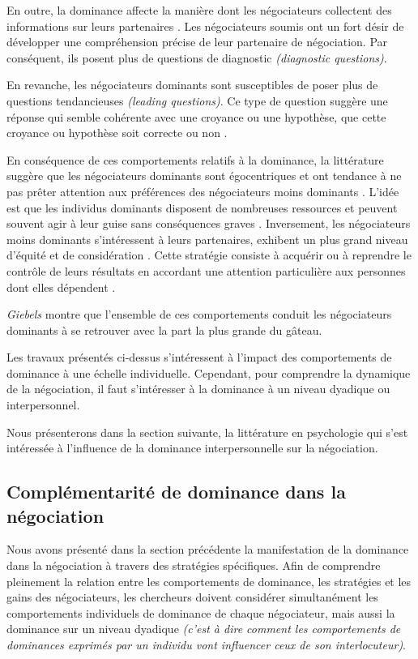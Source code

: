		En outre, la dominance affecte la manière dont les négociateurs collectent des informations sur leurs partenaires \cite{de2004influence}. Les négociateurs soumis ont un fort désir de développer une compréhension précise de leur partenaire de négociation. Par conséquent, ils posent plus de questions de diagnostic \emph {(diagnostic questions)}.
		
		En revanche, les négociateurs dominants sont susceptibles de poser plus de questions tendancieuses \emph {(leading questions)}. Ce type de question suggère une réponse qui semble cohérente avec une croyance ou une hypothèse, que cette croyance ou hypothèse soit correcte ou non \cite{galinsky2003power}.
		
		En conséquence de ces comportements relatifs à la dominance, la littérature suggère que les négociateurs dominants sont égocentriques et ont tendance à ne pas prêter attention aux préférences des négociateurs moins dominants  \cite{fiske1993controlling, de1995impact}. L'idée est que les individus dominants disposent de nombreuses ressources et peuvent souvent agir à leur guise sans conséquences graves \cite{van2006power}. Inversement, les négociateurs moins dominants s'intéressent à leurs partenaires, exhibent un plus grand niveau d'équité et de considération \cite{de1995impact}. Cette stratégie consiste à acquérir ou à reprendre le contrôle de leurs résultats en accordant une attention particulière aux personnes dont elles dépendent \cite{fiske1993controlling}.
		
		\emph{Giebels} \cite{giebels2000interdependence} montre que l'ensemble de ces comportements conduit les négociateurs dominants à se retrouver avec la part la plus grande du gâteau.
		
		Les travaux présentés ci-dessus s'intéressent à l'impact des comportements de dominance à une échelle individuelle. Cependant, pour comprendre la dynamique de la négociation, il faut s'intéresser à la dominance à un niveau dyadique ou interpersonnel. 
		
		Nous présenterons dans la section suivante, la littérature en psychologie qui s'est intéressée à l'influence de la dominance interpersonnelle sur la négociation. 
		
		\subsection{Complémentarité de dominance dans la négociation}  \label{sec:compEtat}
		
		Nous avons présenté dans la section précédente la manifestation de la dominance dans la négociation à travers des stratégies spécifiques. Afin de comprendre pleinement la relation entre les comportements de dominance, les stratégies et les gains des négociateurs, les chercheurs doivent considérer simultanément les comportements individuels de dominance de chaque négociateur, mais aussi la dominance sur un niveau dyadique \emph{(c'est à dire comment les comportements de dominances exprimés par un individu vont influencer ceux de son interlocuteur)}. 
		
